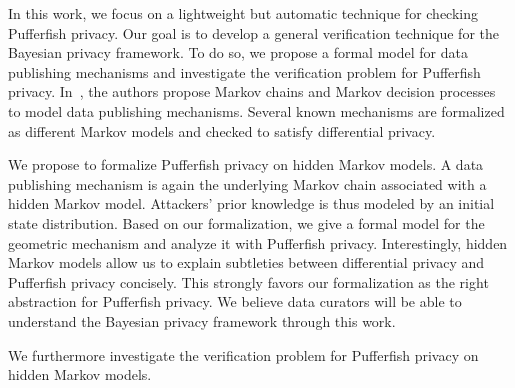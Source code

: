 
In this work, we focus on a lightweight but automatic technique for
checking Pufferfish privacy. Our goal is to develop a general
verification technique for the Bayesian privacy framework. To do so,
we propose a formal model for data publishing mechanisms and
investigate the verification problem for Pufferfish privacy.
In~\cite{LWZ:18:MCDPP}, the authors propose Markov chains and Markov
decision processes to model data publishing mechanisms. Several known
mechanisms are formalized as different Markov models and checked to
satisfy differential privacy.

We propose to formalize Pufferfish privacy on hidden Markov models. A
data publishing mechanism is again the underlying Markov 
chain associated with a hidden Markov model. Attackers' prior
knowledge is thus modeled by an initial state distribution. Based on
our formalization, we give a formal model for the geometric mechanism
and analyze it with Pufferfish privacy. Interestingly, hidden Markov
models allow us to explain subtleties between differential privacy and
Pufferfish privacy concisely. This strongly favors our formalization
as the right abstraction for Pufferfish privacy. We believe data
curators will be able to understand the Bayesian privacy framework
through this work.

We furthermore investigate the verification problem for Pufferfish
privacy on hidden Markov models. 


